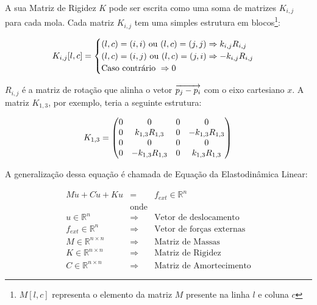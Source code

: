 A sua Matriz de Rigidez $K$ pode ser escrita como uma soma de matrizes $K_{i,j}$ para cada mola. Cada matriz $K_{i,j}$ tem uma simples estrutura em blocos\footnote{$M[l, c]$ representa o elemento da matriz $M$ presente na linha $l$ e coluna $c$}:

\begin{equation}
K_{i,j}[l, c] = \begin{cases}
	(l, c) = (i, i) \text{ ou } (l, c) = (j, j) \Rightarrow k_{i,j}R_{i,j} \\
	(l, c) = (i, j) \text{ ou } (l, c) = (j, i) \Rightarrow -k_{i,j}R_{i,j} \\
	\text{Caso contrário } \Rightarrow 0 \\
	\end{cases}\\
\end{equation}

$R_{i,j}$ é a matriz de rotação que alinha o vetor $\overrightarrow{p_j-p_i}$ com o eixo cartesiano $x$. A matriz $K_{1,3}$, por exemplo, teria a seguinte estrutura:

\begin{equation}
	K_{1,3} = \begin{pmatrix}
		0 & 0 & 0 & 0\\
		0 & k_{1,3}R_{1,3} & 0 & -k_{1,3}R_{1,3}\\
		0 & 0 & 0 & 0\\
		0 & -k_{1,3}R_{1,3} & 0 & k_{1,3}R_{1,3}
	\end{pmatrix}\\
\end{equation}

A generalização dessa equação é chamada de Equação da Elastodinâmica Linear: 

\begin{eqnarray}
M\ddot{u} + C\dot{u} + Ku &=& f_{ext} \in \mathbb{R}^n \label{elastodynamic} \\
&\text{onde}&\nonumber\\
u \in \mathbb{R}^{n} &\Rightarrow& \text{Vetor de deslocamento} \nonumber\\
f_{ext} \in \mathbb{R}^{n} &\Rightarrow& \text{Vetor de forças externas} \nonumber\\
M \in \mathbb{R}^{n\times n} &\Rightarrow& \text{Matriz de Massas} \nonumber\\
K \in \mathbb{R}^{n\times n} &\Rightarrow& \text{Matriz de Rigidez} \nonumber\\
C \in \mathbb{R}^{n\times n} &\Rightarrow& \text{Matriz de Amortecimento} \nonumber
\end{eqnarray}

